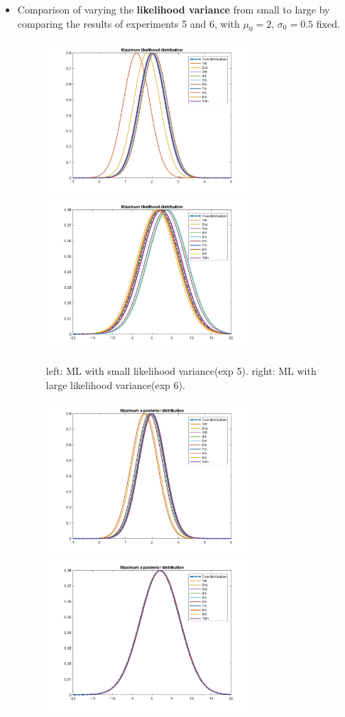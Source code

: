 \documentclass[a4paper]{article}
\begin{document}
\begin{spacing}{2.0}
\begin{itemize}
\newpage
\item
Comparison of varying the \textbf{likelihood variance} from small to large by comparing the results of experiments 5 and 6, with $\mu_0 = 2$, $\sigma_0 = 0.5$ fixed.
\begin{figure}[H]
	\centering
	\includegraphics[width=3in]{ML5.jpg}
	\includegraphics[width=3in]{ML6.jpg}
	\caption{left: ML with small likelihood variance(exp 5). right: ML with large likelihood variance(exp 6).}
	\label{q}
\end{figure}
\begin{figure}[H]
	\centering
	\includegraphics[width=3in]{MAP5.jpg}
	\includegraphics[width=3in]{MAP6.jpg}

\end{figure}
\end{itemize}
\end{spacing}
\end{document}
